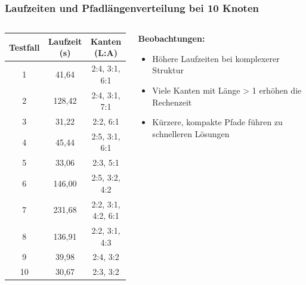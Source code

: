 \documentclass[9pt]{beamer}
\begin{document}
\begin{frame}
    \frametitle{Laufzeiten und Pfadlängenverteilung bei 10 Knoten}

    \begin{columns}
        \begin{column}{0.55\textwidth}
            \scriptsize
            \begin{tabular}{|c|c|c|}
                \hline
                \textbf{Testfall} & \textbf{Laufzeit (s)} & \textbf{Kanten (L:A)} \\
                \hline
                1 & 41{,}64 & 2:4, 3:1, 6:1 \\
                2 & 128{,}42 & 2:4, 3:1, 7:1 \\
                3 & 31{,}22 & 2:2, 6:1 \\
                4 & 45{,}44 & 2:5, 3:1, 6:1 \\
                5 & 33{,}06 & 2:3, 5:1 \\
                6 & 146{,}00 & 2:5, 3:2, 4:2 \\
                7 & 231{,}68 & 2:2, 3:1, 4:2, 6:1 \\
                8 & 136{,}91 & 2:2, 3:1, 4:3 \\
                9 & 39{,}98 & 2:4, 3:2 \\
                10 & 30{,}67 & 2:3, 3:2 \\
                \hline
            \end{tabular}
        \end{column}

        \begin{column}{0.4\textwidth}
            \footnotesize
            \textbf{Beobachtungen:}
            \begin{itemize}
                \item Höhere Laufzeiten bei komplexerer Struktur
                \item Viele Kanten mit Länge > 1 erhöhen die Rechenzeit
                \item Kürzere, kompakte Pfade führen zu schnelleren Lösungen
            \end{itemize}
        \end{column}
    \end{columns}
\end{frame}
\end{document}
